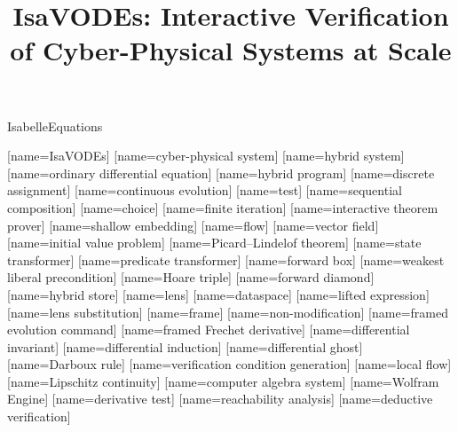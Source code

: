 \documentclass[hidelinks]{article}
\title{IsaVODEs: Interactive Verification of Cyber-Physical Systems at Scale}
\author{}
\date{}
\begin{document}
\maketitle

\begin{smodule}[title={IsaVODEs: Interactive Verification of Cyber-Physical Systems at Scale}]{IsabelleEquations}

[name=IsaVODEs]
[name={cyber-physical system}]
[name={hybrid system}]
[name={ordinary differential equation}]
[name={hybrid program}]
[name={discrete assignment}]
[name={continuous evolution}]
[name=test]
[name={sequential composition}]
[name=choice]
[name={finite iteration}]
[name={interactive theorem prover}]
[name={shallow embedding}]
[name=flow]
[name={vector field}]
[name={initial value problem}]
[name={Picard--Lindelof theorem}]
[name={state transformer}]
[name={predicate transformer}]
[name={forward box}]
[name={weakest liberal precondition}]
[name={Hoare triple}]
[name={forward diamond}]
[name={hybrid store}]
[name=lens]
[name=dataspace]
[name={lifted expression}]
[name={lens substitution}]
[name=frame]
[name=non-modification]
[name={framed evolution command}]
[name={framed Frechet derivative}]
[name={differential invariant}]
[name={differential induction}]
[name={differential ghost}]
[name={Darboux rule}]
[name={verification condition generation}]
[name={local flow}]
[name={Lipschitz continuity}]
[name={computer algebra system}]
[name={Wolfram Engine}]
[name={derivative test}]
[name={reachability analysis}]
[name={deductive verification}]


\end{smodule}
\end{document}

